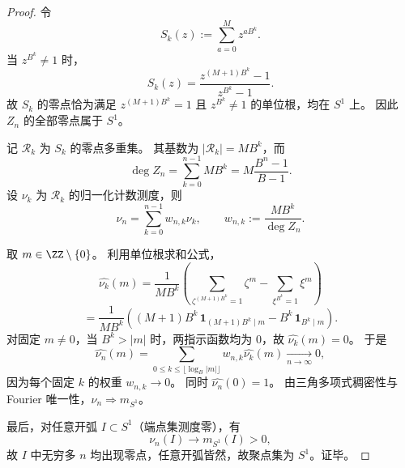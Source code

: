 \begin{proof}
令
\[
S_k(z):=\sum_{a=0}^{M}z^{aB^k}.
\]
当 \(z^{B^k}\neq 1\) 时，
\[
S_k(z)=\frac{z^{(M+1)B^k}-1}{z^{B^k}-1}.
\]
故 \(S_k\) 的零点恰为满足 \(z^{(M+1)B^k}=1\) 且 \(z^{B^k}\neq 1\) 的单位根，均在 \(S^1\) 上。
因此 \(Z_n\) 的全部零点属于 \(S^1\)。

记 \(\mathcal R_k\) 为 \(S_k\) 的零点多重集。
其基数为 \(|\mathcal R_k|=MB^k\)，而
\[
\deg Z_n=\sum_{k=0}^{n-1}MB^k=M\frac{B^n-1}{B-1}.
\]
设 \(\nu_k\) 为 \(\mathcal R_k\) 的归一化计数测度，则
\[
\nu_n=\sum_{k=0}^{n-1}w_{n,k}\nu_k,\qquad
w_{n,k}:=\frac{MB^k}{\deg Z_n}.
\]

取 \(m\in\ZZ\setminus\{0\}\)。
利用单位根求和公式，
\[
\widehat{\nu_k}(m)
=\frac{1}{MB^k}
\left(
\sum_{\zeta^{(M+1)B^k}=1}\zeta^m
-\sum_{\xi^{B^k}=1}\xi^m
\right)
\]
\[
=\frac{1}{MB^k}
\left(
(M+1)B^k\,\mathbf 1_{(M+1)B^k\mid m}
-B^k\,\mathbf 1_{B^k\mid m}
\right).
\]
对固定 \(m\neq 0\)，当 \(B^k>|m|\) 时，两指示函数均为 \(0\)，故 \(\widehat{\nu_k}(m)=0\)。
于是
\[
\widehat{\nu_n}(m)
=\sum_{0\le k\le \lfloor \log_B|m|\rfloor}w_{n,k}\widehat{\nu_k}(m)\xrightarrow[n\to\infty]{}0,
\]
因为每个固定 \(k\) 的权重 \(w_{n,k}\to 0\)。
同时 \(\widehat{\nu_n}(0)=1\)。
由三角多项式稠密性与 Fourier 唯一性，\(\nu_n\Rightarrow m_{S^1}\)。

最后，对任意开弧 \(I\subset S^1\)（端点集测度零），有
\[
\nu_n(I)\to m_{S^1}(I)>0,
\]
故 \(I\) 中无穷多 \(n\) 均出现零点，任意开弧皆然，故聚点集为 \(S^1\)。证毕。
\end{proof}

